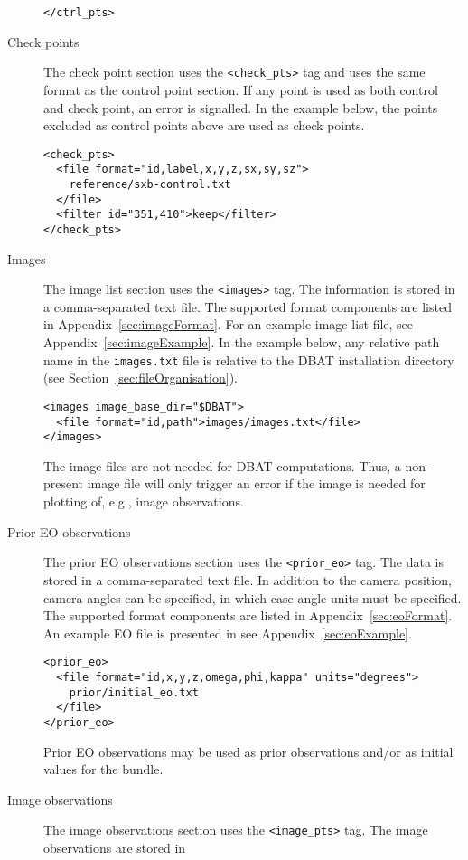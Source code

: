 \documentclass{article}
\begin{document}
\begin{description}
\begin{verbatim}
</ctrl_pts>
\end{verbatim}
\item[{Check points}] The check point section uses the \texttt{<check\_pts>} tag
and uses the same format as the control point
section. If any point is used as both control and
check point, an error is signalled. In the example
below, the points excluded as control points above
are used as check points.
\begin{verbatim}
<check_pts>
  <file format="id,label,x,y,z,sx,sy,sz">
    reference/sxb-control.txt
  </file>
  <filter id="351,410">keep</filter>
</check_pts>
\end{verbatim}
\item[{Images}] The image list section uses the \texttt{<images>} tag. The
information is stored in a comma-separated text file. The
supported format components are listed in
Appendix~\ref{sec:imageFormat}. For an example image list
file, see Appendix~\ref{sec:imageExample}. In the example
below, any relative path name in the \texttt{images.txt} file is
relative to the DBAT installation directory (see
Section~\ref{sec:fileOrganisation}).
\begin{verbatim}
<images image_base_dir="$DBAT">
  <file format="id,path">images/images.txt</file>
</images>
\end{verbatim}
The image files are not needed for DBAT computations.
Thus, a non-present image file will only trigger an error
if the image is needed for plotting of, e.g., image
observations.
\item[{Prior EO observations}] The prior EO observations section uses the
\texttt{<prior\_eo>} tag. The data is stored in a comma-separated text
file. In addition to the camera position, camera angles can be
specified, in which case angle units must be specified. The
supported format components are listed in
Appendix~\ref{sec:eoFormat}. An example EO file is presented in
see Appendix~\ref{sec:eoExample}.
\begin{verbatim}
<prior_eo>
  <file format="id,x,y,z,omega,phi,kappa" units="degrees">
    prior/initial_eo.txt
  </file>
</prior_eo>
\end{verbatim}
Prior EO observations may be used as prior observations and/or as
initial values for the bundle. \newpage
\item[{Image observations}] The image observations section uses the
\texttt{<image\_pts>} tag. The image observations are stored in

\end{description}
\end{document}
